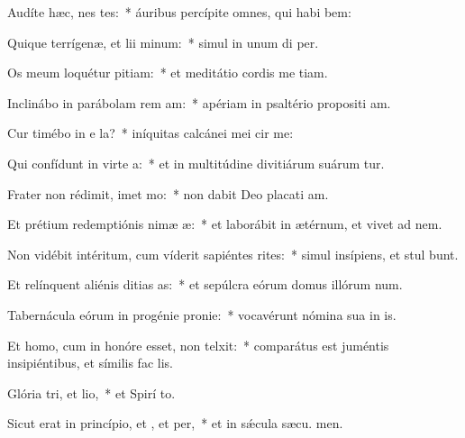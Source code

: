 \item Audíte hæc, nes tes:~* áuribus percípite omnes, qui habi bem:
\item Quique terrígenæ, et lii minum:~* simul in unum di  per.
\item Os meum loquétur pitiam:~* et meditátio cordis me tiam.
\item Inclinábo in parábolam rem am:~* apériam in psaltério propositi am.
\item Cur timébo in e la?~* iníquitas calcánei mei cir me:
\item Qui confídunt in virte a:~* et in multitúdine divitiárum suárum tur.
\item Frater non rédimit, imet mo:~* non dabit Deo placati am.
\item Et prétium redemptiónis nimæ æ:~* et laborábit in ætérnum, et vivet ad  nem.
\item Non vidébit intéritum, cum víderit sapiéntes rites:~* simul insípiens, et stul bunt.
\item Et relínquent aliénis ditias as:~* et sepúlcra eórum domus illórum  num.
\item Tabernácula eórum in progénie  pronie:~* vocavérunt nómina sua in  is.
\item Et homo, cum in honóre esset, non telxit:~* comparátus est juméntis insipiéntibus, et símilis fac  lis.
\item Glória tri, et lio,~* et Spirí to.
\item Sicut erat in princípio, et , et per,~* et in sǽcula sæcu. men.
